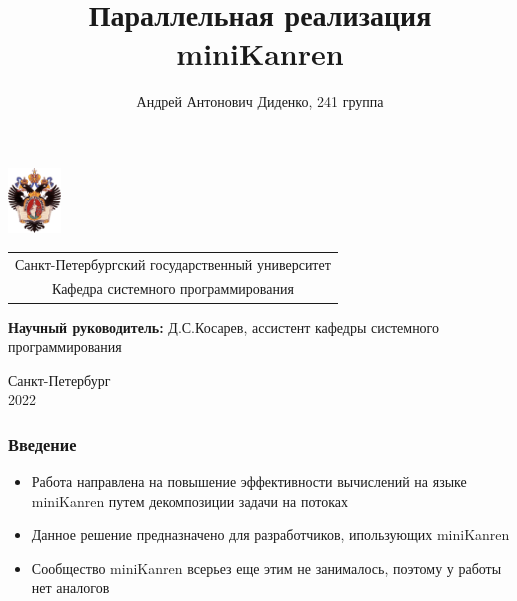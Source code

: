\documentclass{beamer}
\title[Параллелизация miniKanren]{Параллельная реализация miniKanren}
\institute[СПбГУ]{}
\author[Андрей Диденко]{Андрей Антонович Диденко, 241 группа}
\begin{document}
{
\begin{frame}
  \includegraphics[width=1.4cm]{pictures/SPbGU_Logo.png}
  \vspace{-35pt}
  \hspace{-10pt}
  \begin{center}
    \begin{tabular}{c}
      \scriptsize{Санкт-Петербургский государственный университет} \\
      \scriptsize{Кафедра системного программирования}
    \end{tabular}
    \titlepage
  \end{center}

  \btVFill

  {\scriptsize
    {\bfseries Научный руководитель:} Д.С.Косарев, ассистент кафедры системного программирования \\
  }
  \begin{center}
    \vspace{5pt}
    \scriptsize{Санкт-Петербург\\
      2022}
  \end{center}

\end{frame}
}

\begin{frame}[fragile]
  \frametitle{Введение}
  \begin{itemize}
    \item Работа направлена на повышение эффективности вычислений на языке miniKanren путем декомпозиции задачи на потоках
    \item Данное решение предназначено для разработчиков, ипользующих miniKanren
    \item Сообщество miniKanren всерьез еще этим не занималось, поэтому у работы нет аналогов
  \end{itemize}
\end{frame}
\end{document}
